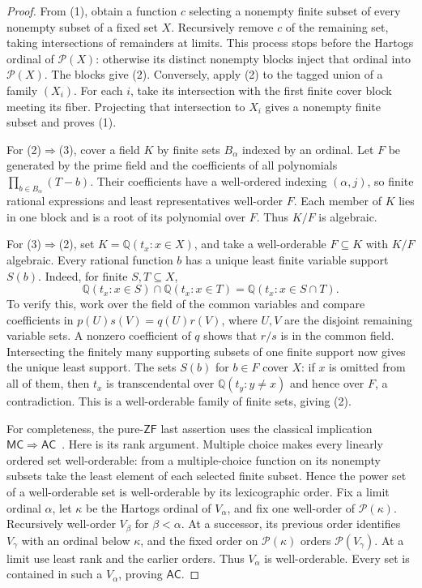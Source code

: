 \documentclass[11pt,a4paper]{article}
\theoremstyle{definition}\newtheorem{definition}[theorem]{Definition}
\theoremstyle{remark}\newtheorem{remark}[theorem]{Remark}
\newcommand{\ZF}{\mathsf{ZF}}\newcommand{\ZFA}{\mathsf{ZFA}}
\newcommand{\AC}{\mathsf{AC}}\newcommand{\BPI}{\mathsf{BPI}}
\newcommand{\Q}{\mathbb Q}\newcommand{\F}{\mathbb F}
\begin{document}
\begin{proof}
From (1), obtain a function $c$ selecting a nonempty finite subset of every nonempty subset of a fixed set $X$. Recursively remove $c$ of the remaining set, taking intersections of remainders at limits. This process stops before the Hartogs ordinal of $\mathcal P(X)$: otherwise its distinct nonempty blocks inject that ordinal into $\mathcal P(X)$. The blocks give (2). Conversely, apply (2) to the tagged union of a family $(X_i)$. For each $i$, take its intersection with the first finite cover block meeting its fiber. Projecting that intersection to $X_i$ gives a nonempty finite subset and proves (1).

For (2)$\Rightarrow$(3), cover a field $K$ by finite sets $B_\alpha$ indexed by an ordinal. Let $F$ be generated by the prime field and the coefficients of all polynomials $\prod_{b\in B_\alpha}(T-b)$. Their coefficients have a well-ordered indexing $(\alpha,j)$, so finite rational expressions and least representatives well-order $F$. Each member of $K$ lies in one block and is a root of its polynomial over $F$. Thus $K/F$ is algebraic.

For (3)$\Rightarrow$(2), set $K=\Q(t_x:x\in X)$, and take a well-orderable $F\subseteq K$ with $K/F$ algebraic. Every rational function $b$ has a unique least finite variable support $S(b)$. Indeed, for finite $S,T\subseteq X$,
\[
\Q(t_x:x\in S)\cap\Q(t_x:x\in T)
=\Q(t_x:x\in S\cap T).
\]
To verify this, work over the field of the common variables and compare coefficients in $p(U)s(V)=q(U)r(V)$, where $U,V$ are the disjoint remaining variable sets. A nonzero coefficient of $q$ shows that $r/s$ is in the common field. Intersecting the finitely many supporting subsets of one finite support now gives the unique least support. The sets $S(b)$ for $b\in F$ cover $X$: if $x$ is omitted from all of them, then $t_x$ is transcendental over $\Q(t_y:y\ne x)$ and hence over $F$, a contradiction. This is a well-orderable family of finite sets, giving (2).

For completeness, the pure-$\ZF$ last assertion uses the classical implication $\mathsf{MC}\Rightarrow\AC$~\cite[Theorem~9.1]{Jech}. Here is its rank argument. Multiple choice makes every linearly ordered set well-orderable: from a multiple-choice function on its nonempty subsets take the least element of each selected finite subset. Hence the power set of a well-orderable set is well-orderable by its lexicographic order. Fix a limit ordinal $\alpha$, let $\kappa$ be the Hartogs ordinal of $V_\alpha$, and fix one well-order of $\mathcal P(\kappa)$. Recursively well-order $V_\beta$ for $\beta<\alpha$. At a successor, its previous order identifies $V_\gamma$ with an ordinal below $\kappa$, and the fixed order on $\mathcal P(\kappa)$ orders $\mathcal P(V_\gamma)$. At a limit use least rank and the earlier orders. Thus $V_\alpha$ is well-orderable. Every set is contained in such a $V_\alpha$, proving $\AC$.
\end{proof}
\end{document}
